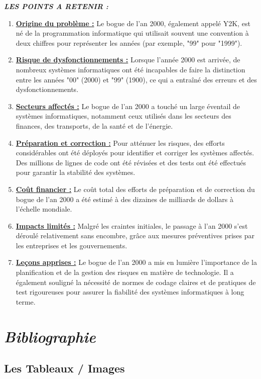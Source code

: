 \documentclass[12pt,a4paper]{article}
\begin{document}
\begin{center}
\textit{\textbf{\color{red}LES POINTS A RETENIR :}}
\end{center}
\begin{enumerate}
   \item \underline{\textbf{Origine du problème :}} Le bogue de l'an 2000, également appelé Y2K, est né de la programmation informatique qui utilisait souvent une convention à deux chiffres pour représenter les années (par exemple, "99" pour "1999").

    \item \underline{\textbf{Risque de dysfonctionnements :}} Lorsque l'année 2000 est arrivée, de nombreux systèmes informatiques ont été incapables de faire la distinction entre les années "00" (2000) et "99" (1900), ce qui a entraîné des erreurs et des dysfonctionnements.

    \item \underline{\textbf{Secteurs affectés :}} Le bogue de l'an 2000 a touché un large éventail de systèmes informatiques, notamment ceux utilisés dans les secteurs des finances, des transports, de la santé et de l'énergie.

    \item \underline{\textbf{Préparation et correction :}} Pour atténuer les risques, des efforts considérables ont été déployés pour identifier et corriger les systèmes affectés. Des millions de lignes de code ont été révisées et des tests ont été effectués pour garantir la stabilité des systèmes.

    \item \underline{\textbf{Coût financier :}} Le coût total des efforts de préparation et de correction du bogue de l'an 2000 a été estimé à des dizaines de milliards de dollars à l'échelle mondiale.

    \item \underline{\textbf{Impacts limités :}} Malgré les craintes initiales, le passage à l'an 2000 s'est déroulé relativement sans encombre, grâce aux mesures préventives prises par les entreprises et les gouvernements.

   \item \underline{\textbf{Leçons apprises :}} Le bogue de l'an 2000 a mis en lumière l'importance de la planification et de la gestion des risques en matière de technologie. Il a également souligné la nécessité de normes de codage claires et de pratiques de test rigoureuses pour assurer la fiabilité des systèmes informatiques à long terme.
\cite{vid}
\end{enumerate}




\newpage
\section{\textit{Bibliographie}}

\subsection*{Les Tableaux / Images}

\listoffigures
\listoftables





\end{document}
